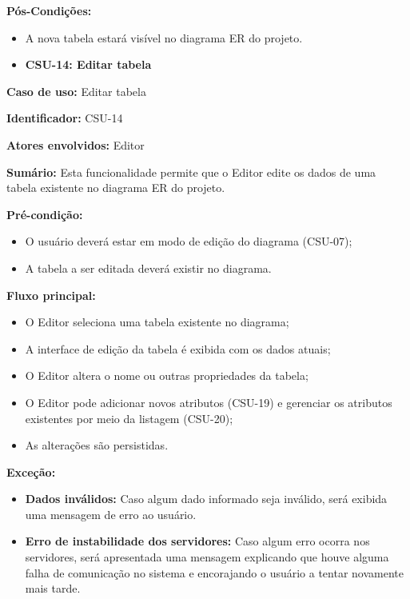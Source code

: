 \textbf{Pós-Condições:}
\begin{itemize}
    \item A nova tabela estará visível no diagrama ER do projeto.
\end{itemize}

\vspace{1em}

\begin{itemize}
    \item \textbf{CSU-14: Editar tabela}
\end{itemize}

\textbf{Caso de uso:} Editar tabela

\textbf{Identificador:} CSU-14

\textbf{Atores envolvidos:} Editor

\textbf{Sumário:} Esta funcionalidade permite que o Editor edite os dados de uma tabela existente no diagrama ER do projeto.

\textbf{Pré-condição:}
\begin{itemize}
    \item O usuário deverá estar em modo de edição do diagrama (CSU-07);
    \item A tabela a ser editada deverá existir no diagrama.
\end{itemize}

\textbf{Fluxo principal:}
\begin{itemize}
    \item O Editor seleciona uma tabela existente no diagrama;
    \item A interface de edição da tabela é exibida com os dados atuais;
    \item O Editor altera o nome ou outras propriedades da tabela;
    \item O Editor pode adicionar novos atributos (CSU-19) e gerenciar os atributos existentes por meio da listagem (CSU-20);
    \item As alterações são persistidas.
\end{itemize}

\textbf{Exceção:}
\begin{itemize}
    \item \textbf{Dados inválidos:} Caso algum dado informado seja inválido, será exibida uma mensagem de erro ao usuário.
    \item \textbf{Erro de instabilidade dos servidores:} Caso algum erro ocorra nos servidores, será apresentada uma mensagem explicando que houve alguma falha de comunicação no sistema e encorajando o usuário a tentar novamente mais tarde.
\end{itemize}

